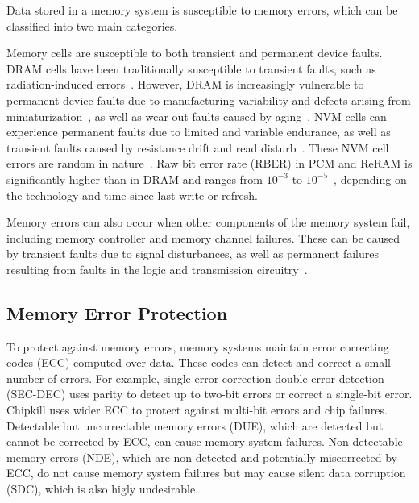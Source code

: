 
Data stored in a memory system is susceptible to memory errors, which can be classified into two main categories. 

Memory cells are susceptible to both transient and permanent device faults.
DRAM cells have been traditionally susceptible to transient faults, such as radiation-induced errors~\cite{schroeder:dramfailures:sigmetrics:2009}. However, DRAM is increasingly vulnerable to permanent device faults due to manufacturing variability and defects arising from miniaturization~\cite{cha:dram-defects:hpca:2017}, as well as wear-out faults caused by aging~\cite{fieback:dram-aging:delft:2017}.
NVM cells can experience permanent faults due to limited and variable endurance, as well as transient faults caused by resistance drift and read disturb~\cite{yoon:freep:hpca:2011}.
These NVM cell errors are random in nature~\cite{zhang:pm-chipkill:micro:2018}. 
Raw bit error rate (RBER) in PCM and ReRAM is significantly higher than in DRAM and ranges from $10^{-3}$ to $10^{-5}$~\cite{zhang:pm-chipkill:micro:2018}, depending on the technology and time since last write or refresh.

Memory errors can also occur when other components of the memory system fail, including memory controller and memory channel failures. 
These can be caused by transient faults due to signal disturbances, as well as permanent failures resulting from faults in the logic and transmission circuitry~\cite{meza:dramfailures:dsn:2015}.

\subsection{Memory Error Protection}

To protect against memory errors, memory systems maintain error correcting codes (ECC) computed over data. 
These codes can detect and correct a small number of errors.
For example, single error correction double error detection (SEC-DEC) uses parity to detect up to two-bit errors or correct a single-bit error.
Chipkill uses wider ECC to protect against multi-bit errors and chip failures.
Detectable but uncorrectable memory errors (DUE), which are detected but cannot be corrected by ECC, can cause memory system failures.
Non-detectable memory errors (NDE), which are non-detected and potentially miscorrected by ECC, do not cause memory system failures but may cause silent data corruption (SDC), which is also higly undesirable. 

